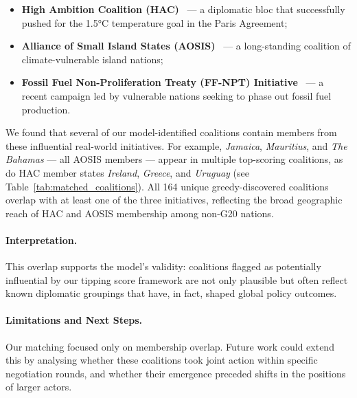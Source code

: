\documentclass[11pt]{article}
\begin{document}
\begin{itemize}
	\item \textbf{High Ambition Coalition (HAC)}~\cite{yamin2021hac} — a diplomatic bloc that successfully pushed for the 1.5°C temperature goal in the Paris Agreement;
	\item \textbf{Alliance of Small Island States (AOSIS)}~\cite{aosis2023, betzold2012aosis} — a long-standing coalition of climate-vulnerable island nations;
	\item \textbf{Fossil Fuel Non-Proliferation Treaty (FF-NPT) Initiative}~\cite{ffnpt2024} — a recent campaign led by vulnerable nations seeking to phase out fossil fuel production.
\end{itemize}

We found that several of our model-identified coalitions contain members from these influential real-world initiatives. For example, \textit{Jamaica}, \textit{Mauritius}, and \textit{The Bahamas} — all AOSIS members — appear in multiple top-scoring coalitions, as do HAC member states \textit{Ireland}, \textit{Greece}, and \textit{Uruguay} (see Table~\ref{tab:matched_coalitions}). All 164 unique greedy-discovered coalitions overlap with at least one of the three initiatives, reflecting the broad geographic reach of HAC and AOSIS membership among non-G20 nations.

\paragraph{Interpretation.}
This overlap supports the model's validity: coalitions flagged as potentially influential by our tipping score framework are not only plausible but often reflect known diplomatic groupings that have, in fact, shaped global policy outcomes.

\paragraph{Limitations and Next Steps.}
Our matching focused only on membership overlap. Future work could extend this by analysing whether these coalitions took joint action within specific negotiation rounds, and whether their emergence preceded shifts in the positions of larger actors.

\begin{table}[htbp]
	\centering
	\scriptsize
	
	\caption{Sample of high-scoring minor-player coalitions with overlaps to known real-world initiatives. Full results available at:
		[details withheld for double-anonymous review]}
	\label{tab:matched_coalitions}
\end{table}
\end{document}
